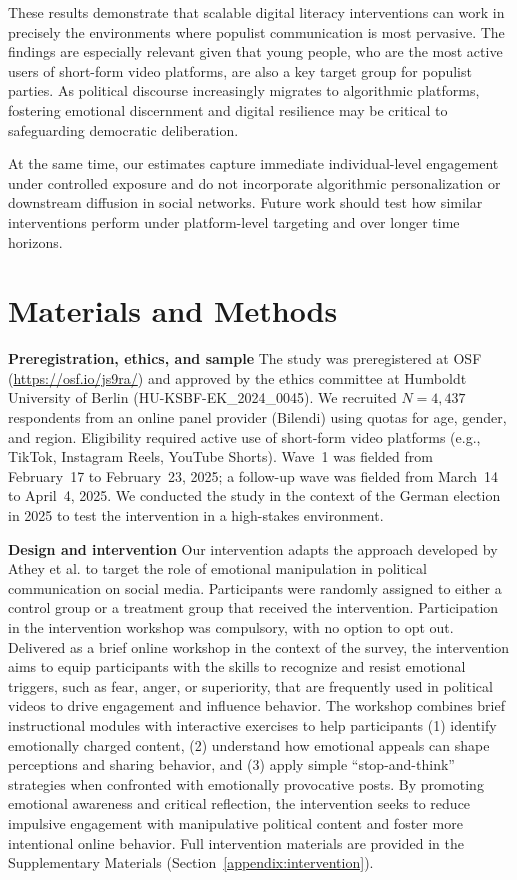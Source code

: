 \documentclass[12pt]{article}
\begin{document}
These results demonstrate that scalable digital literacy interventions can work in precisely the environments where populist communication is most pervasive. The findings are especially relevant given that young people, who are the most active users of short-form video platforms, are also a key target group for populist parties. As political discourse increasingly migrates to algorithmic platforms, fostering emotional discernment and digital resilience may be critical to safeguarding democratic deliberation.

At the same time, our estimates capture immediate individual-level engagement under controlled exposure and do not incorporate algorithmic personalization or downstream diffusion in social networks. Future work should test how similar interventions perform under platform-level targeting and over longer time horizons.




\section*{Materials and Methods}

\textbf{Preregistration, ethics, and sample}
The study was preregistered at OSF (\url{https://osf.io/js9ra/}) and approved by the ethics committee at Humboldt University of Berlin (HU-KSBF-EK\_2024\_0045). We recruited $N=4{,}437$ respondents from an online panel provider (Bilendi) using quotas for age, gender, and region. Eligibility required active use of short-form video platforms (e.g., TikTok, Instagram Reels, YouTube Shorts). Wave~1 was fielded from February~17 to February~23, 2025; a follow-up wave was fielded from March~14 to April~4, 2025.  We conducted the study in the context of the German election in 2025 to test the intervention in a high-stakes environment. 

\textbf{Design and intervention}
Our intervention adapts the approach developed by Athey et al. \cite{carletonathey2023} to target the role of emotional manipulation in political communication on social media. Participants were randomly assigned to either a control group or a treatment group that received the intervention. Participation in the intervention workshop was compulsory, with no option to opt out. Delivered as a brief online workshop in the context of the survey, the intervention aims to equip participants with the skills to recognize and resist emotional triggers, such as fear, anger, or superiority, that are frequently used in political videos to drive engagement and influence behavior. The workshop combines brief instructional modules with interactive exercises to help participants (1) identify emotionally charged content, (2) understand how emotional appeals can shape perceptions and sharing behavior, and (3) apply simple “stop-and-think” strategies when confronted with emotionally provocative posts. By promoting emotional awareness and critical reflection, the intervention seeks to reduce impulsive engagement with manipulative political content and foster more intentional online behavior.  Full intervention materials are provided in the Supplementary Materials (Section~\ref{appendix:intervention}).
\end{document}
